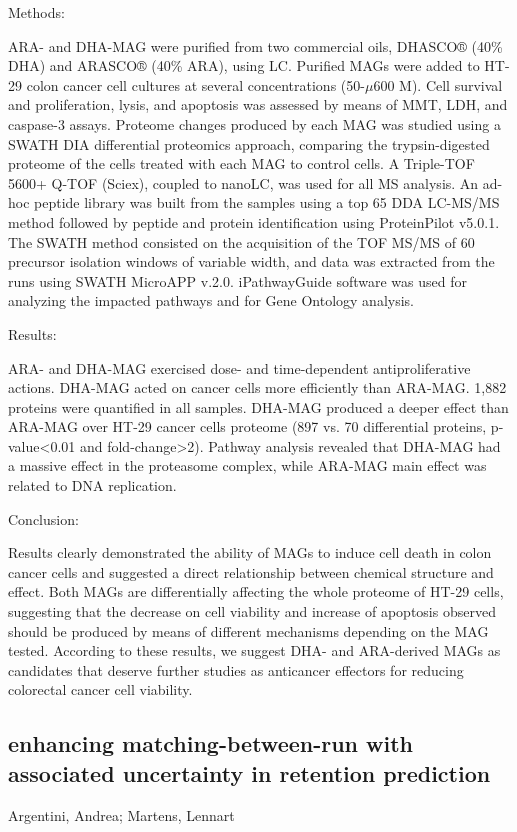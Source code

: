{Methods:

ARA- and DHA-MAG were purified from two commercial oils, DHASCO® (40\% DHA) and ARASCO® (40\% ARA), using LC. Purified MAGs were added to HT-29 colon cancer cell cultures at several concentrations (50-$\mu$600 M). Cell survival and proliferation, lysis, and apoptosis was assessed by means of MMT, LDH, and caspase-3 assays. Proteome changes produced by each MAG was studied using a SWATH DIA differential proteomics approach, comparing the trypsin-digested proteome of the cells treated with each MAG to control cells. A Triple-TOF 5600+ Q-TOF (Sciex), coupled to nanoLC, was used for all MS analysis. An ad-hoc peptide library was built from the samples using a top 65 DDA LC-MS/MS method followed by peptide and protein identification using ProteinPilot v5.0.1. The SWATH method consisted on the acquisition of the TOF MS/MS of 60 precursor isolation windows of variable width, and data was extracted from the runs using SWATH MicroAPP v.2.0. iPathwayGuide software was used for analyzing the impacted pathways and for Gene Ontology analysis.

Results:

ARA- and DHA-MAG exercised dose- and time-dependent antiproliferative actions. DHA-MAG acted on cancer cells more efficiently than ARA-MAG. 1,882 proteins were quantified in all samples. DHA-MAG produced a deeper effect than ARA-MAG over HT-29 cancer cells proteome (897 vs. 70 differential proteins, p-value<0.01 and fold-change>2). Pathway analysis revealed that DHA-MAG had a massive effect in the proteasome complex, while ARA-MAG main effect was related to DNA replication.

Conclusion:

Results clearly demonstrated the ability of MAGs to induce cell death in colon cancer cells and suggested a direct relationship between chemical structure and effect. Both MAGs are differentially affecting the whole proteome of HT-29 cells, suggesting that the decrease on cell viability and increase of apoptosis observed should be produced by means of different mechanisms depending on the MAG tested. According to these results, we suggest DHA- and ARA-derived MAGs as candidates that deserve further studies as anticancer effectors for reducing colorectal cancer cell viability.


\subsection*{\color{eubicRed} enhancing matching-between-run with associated uncertainty in retention prediction}
{\color{eubicGray}Argentini, Andrea;
Martens, Lennart}

}

